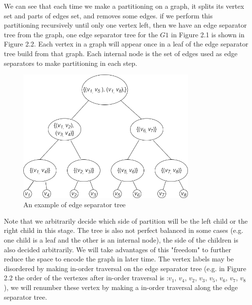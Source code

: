 \documentclass[12pt,glossary]{dalthesis}
\begin{document}
We can see that each time we make a partitioning on a graph, it splits its vertex set and parts of edges set, and removes some edges. if we perform this partitioning recursively until only one vertex left, then we have an edge separator tree from the graph, one edge separator tree for the $G1$ in Figure 2.1 is shown in Figure 2.2. Each vertex in a graph will appear once in a leaf of the edge separator tree build from that graph. Each internal node is the set of edges used as edge separators to make partitioning in each step.

\begin{figure}[ht]
\centering
\includegraphics[width=0.8\textwidth]{separatorTree}
\caption{An example of edge separator tree}
\end{figure}

\bigskip
\bigskip
Note that we arbitrarily decide which side of partition will be the left child or the right child in this stage. The tree is also not perfect balanced in some cases (e.g. one child is a leaf and the other is an internal node), the side of the children is also decided arbitrarily. We will take advantages of this "freedom" to further reduce the space to encode the graph in later time. The vertex labels may be disordered by making in-order traversal on the edge separator tree (e.g. in Figure 2.2 the order of the vertexes after in-order traversal is :$v_{1}$, $v_{4}$, $v_{2}$, $v_{3}$, $v_{5}$, $v_{6}$, $v_{7}$, $v_{8}$), we will renumber these vertex by making a in-order traversal along the edge separator tree.

\bigskip
\bigskip
\end{document}
